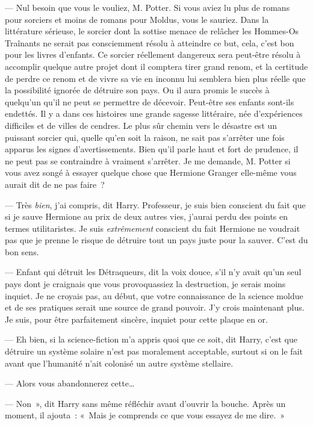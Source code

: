--- Nul besoin que vous le vouliez, M. Potter. Si vous aviez lu plus de romans pour sorciers et moins de romans pour Moldus, vous le sauriez. Dans la littérature sérieuse, le sorcier dont la sottise menace de relâcher les Hommes-Os Traînants ne serait pas consciemment résolu à atteindre ce but, cela, c'est bon pour les livres d'enfants. Ce sorcier réellement dangereux sera peut-être résolu à accomplir quelque autre projet dont il comptera tirer grand renom, et la certitude de perdre ce renom et de vivre sa vie en inconnu lui semblera bien plus réelle que la possibilité ignorée de détruire son pays. Ou il aura promis le succès à quelqu'un qu'il ne peut se permettre de décevoir. Peut-être ses enfants sont-ils endettés. Il y a dans ces histoires une grande sagesse littéraire, née d'expériences difficiles et de villes de cendres. Le plus sûr chemin vers le désastre est un puissant sorcier qui, quelle qu'en soit la raison, ne sait pas s'arrêter une fois apparus les signes d'avertissements. Bien qu'il parle haut et fort de prudence, il ne peut pas se contraindre à vraiment s'arrêter. Je me demande, M. Potter si vous avez songé à essayer quelque chose que Hermione Granger elle-même vous aurait dit de ne pas faire~?

--- Très \emph{bien}, j'ai compris, dit Harry. Professeur, je suis bien conscient du fait que si je sauve Hermione au prix de deux autres vies, j'aurai perdu des points en termes utilitaristes. Je suis \emph{extrêmement} conscient du fait Hermione ne voudrait pas que je prenne le risque de détruire tout un pays juste pour la sauver. C'est du bon sens.

--- Enfant qui détruit les Détraqueurs, dit la voix douce, s'il n'y avait qu'un seul pays dont je craignais que vous provoquassiez la destruction, je serais moins inquiet. Je ne croyais pas, au début, que votre connaissance de la science moldue et de ses pratiques serait une source de grand pouvoir. J'y crois maintenant plus. Je suis, pour être parfaitement sincère, inquiet pour cette plaque en or.

--- Eh bien, si la science-fiction m'a appris quoi que ce soit, dit Harry, c'est que détruire un système solaire n'est pas moralement acceptable, surtout si on le fait avant que l'humanité n'ait colonisé un autre système stellaire.

--- Alors vous abandonnerez cette…

--- Non~», dit Harry sans même réfléchir avant d'ouvrir la bouche. Après un moment, il ajouta~: «~Mais je comprends ce que vous essayez de me dire.~»

